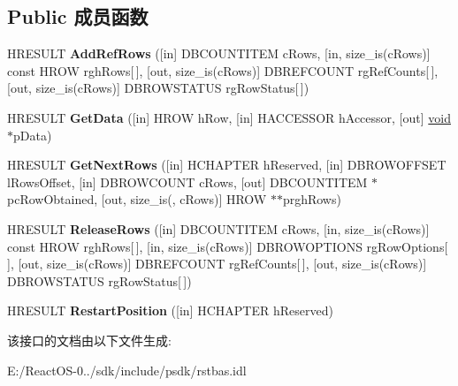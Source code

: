 \subsection*{Public 成员函数}
\begin{DoxyCompactItemize}
\item 
\mbox{\label{interface_i_rowset_a5525ea8b686774161752e532a6a6bf8c}} 
H\+R\+E\+S\+U\+LT {\bfseries Add\+Ref\+Rows} (\mbox{[}in\mbox{]} D\+B\+C\+O\+U\+N\+T\+I\+T\+EM c\+Rows, \mbox{[}in, size\+\_\+is(c\+Rows)\mbox{]} const H\+R\+OW rgh\+Rows\mbox{[}$\,$\mbox{]}, \mbox{[}out, size\+\_\+is(c\+Rows)\mbox{]} D\+B\+R\+E\+F\+C\+O\+U\+NT rg\+Ref\+Counts\mbox{[}$\,$\mbox{]}, \mbox{[}out, size\+\_\+is(c\+Rows)\mbox{]} D\+B\+R\+O\+W\+S\+T\+A\+T\+US rg\+Row\+Status\mbox{[}$\,$\mbox{]})
\item 
\mbox{\label{interface_i_rowset_a11f2500da61dc9fb4b1c6114ca749ea0}} 
H\+R\+E\+S\+U\+LT {\bfseries Get\+Data} (\mbox{[}in\mbox{]} H\+R\+OW h\+Row, \mbox{[}in\mbox{]} H\+A\+C\+C\+E\+S\+S\+OR h\+Accessor, \mbox{[}out\mbox{]} \hyperlink{interfacevoid}{void} $\ast$p\+Data)
\item 
\mbox{\label{interface_i_rowset_a6fccb2955d0ebc866d88a4eaa11fd3a1}} 
H\+R\+E\+S\+U\+LT {\bfseries Get\+Next\+Rows} (\mbox{[}in\mbox{]} H\+C\+H\+A\+P\+T\+ER h\+Reserved, \mbox{[}in\mbox{]} D\+B\+R\+O\+W\+O\+F\+F\+S\+ET l\+Rows\+Offset, \mbox{[}in\mbox{]} D\+B\+R\+O\+W\+C\+O\+U\+NT c\+Rows, \mbox{[}out\mbox{]} D\+B\+C\+O\+U\+N\+T\+I\+T\+EM $\ast$pc\+Row\+Obtained, \mbox{[}out, size\+\_\+is(, c\+Rows)\mbox{]} H\+R\+OW $\ast$$\ast$prgh\+Rows)
\item 
\mbox{\label{interface_i_rowset_a4d118980d9245c7909cf7c6d3ae5a246}} 
H\+R\+E\+S\+U\+LT {\bfseries Release\+Rows} (\mbox{[}in\mbox{]} D\+B\+C\+O\+U\+N\+T\+I\+T\+EM c\+Rows, \mbox{[}in, size\+\_\+is(c\+Rows)\mbox{]} const H\+R\+OW rgh\+Rows\mbox{[}$\,$\mbox{]}, \mbox{[}in, size\+\_\+is(c\+Rows)\mbox{]} D\+B\+R\+O\+W\+O\+P\+T\+I\+O\+NS rg\+Row\+Options\mbox{[}$\,$\mbox{]}, \mbox{[}out, size\+\_\+is(c\+Rows)\mbox{]} D\+B\+R\+E\+F\+C\+O\+U\+NT rg\+Ref\+Counts\mbox{[}$\,$\mbox{]}, \mbox{[}out, size\+\_\+is(c\+Rows)\mbox{]} D\+B\+R\+O\+W\+S\+T\+A\+T\+US rg\+Row\+Status\mbox{[}$\,$\mbox{]})
\item 
\mbox{\label{interface_i_rowset_a89a28210571348e2cf9b7eb1c5649e23}} 
H\+R\+E\+S\+U\+LT {\bfseries Restart\+Position} (\mbox{[}in\mbox{]} H\+C\+H\+A\+P\+T\+ER h\+Reserved)
\end{DoxyCompactItemize}


该接口的文档由以下文件生成\+:\begin{DoxyCompactItemize}
\item 
E\+:/\+React\+O\+S-\/0../sdk/include/psdk/rstbas.\+idl\end{DoxyCompactItemize}
